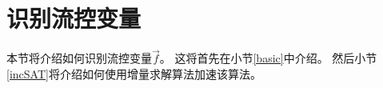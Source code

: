 %
%
%
%
%
%
%
%
%
%
%



\section{识别流控变量}\label{sec_findfc}
本节将介绍如何识别流控变量$\vec{f}$。
这将首先在小节\ref{basic}中介绍。
然后小节\ref{incSAT}将介绍如何使用增量求解算法加速该算法。

